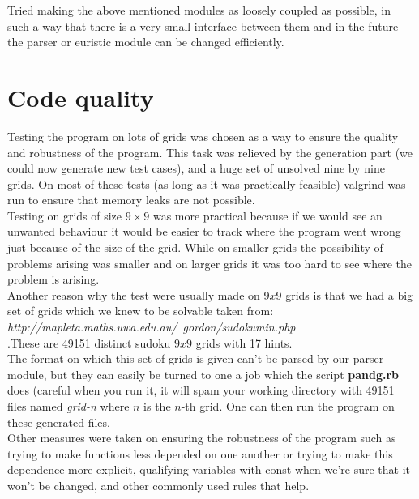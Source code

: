 \documentclass[english,a4paper]{article}
\begin{document}
Tried making the above mentioned modules as loosely coupled as
possible, in such a way that there is a very small interface between
them and in the future the parser or euristic module can be changed
efficiently.

\section{Code quality}

Testing the program on lots of grids was chosen as a way to ensure the
quality and robustness of the program. This task was relieved by the
generation part (we could now generate new test cases), and a huge set
of unsolved nine by nine grids. On most of these tests (as long as it
was practically feasible) valgrind was run to ensure that memory leaks
are not possible.\\

Testing on grids of size $9\times 9$ was more practical because if we
would see an unwanted behaviour it would be easier to track where the
program went wrong just because of the size of the grid. While on
smaller grids the possibility of problems arising was smaller and on
larger grids it was too hard to see where the problem is arising.\\

Another reason why the test were usually made on $9x9$ grids is that
we had a big set of grids which we knew to be solvable taken from:\\
\emph{http://mapleta.maths.uwa.edu.au/~gordon/sudokumin.php}\\
.These are 49151 distinct sudoku $9x9$ grids with 17 hints.\\

The format on which this set of grids is given can't be parsed by our
parser module, but they can easily be turned to one a job which the
script \textbf{pandg.rb} does (careful when you run it, it will spam
your working directory with 49151 files named \emph{grid-n} where $n$
is the $n$-th grid. One can then run the program on these generated
files.\\

Other measures were taken on ensuring the robustness of the program
such as trying to make functions less depended on one another or
trying to make this dependence more explicit, qualifying variables
with const when we're sure that it won't be changed, and other
commonly used rules that help. 
\end{document}
